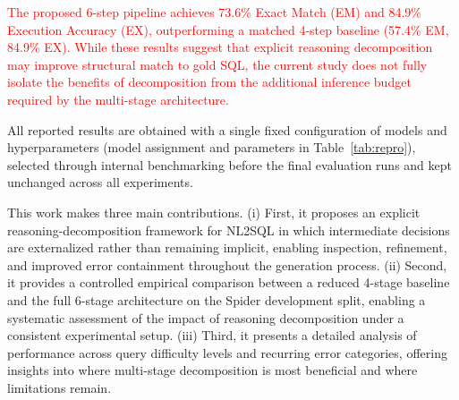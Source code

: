 \documentclass{svproc}
\begin{document}
\textcolor{red}{The proposed 6-step pipeline achieves 73.6\% Exact Match (EM) and 84.9\% Execution Accuracy (EX), outperforming a matched 4-step baseline (57.4\% EM, 84.9\% EX). While these results suggest that explicit reasoning decomposition may improve structural match to gold SQL, the current study does not fully isolate the benefits of decomposition from the additional inference budget required by the multi-stage architecture.}

All reported results are obtained with a single fixed configuration of models and hyperparameters (model assignment and parameters in Table~\ref{tab:repro}), selected through internal benchmarking before the final evaluation runs and kept unchanged across all experiments.


This work makes three main contributions. (i) First, it proposes an explicit reasoning-decomposition framework for NL2SQL in which intermediate decisions are externalized rather than remaining implicit, enabling inspection, refinement, and improved error containment throughout the generation process. (ii) Second, it provides a controlled empirical comparison between a reduced 4-stage baseline and the full 6-stage architecture on the Spider development split, enabling a systematic assessment of the impact of reasoning decomposition under a consistent experimental setup. (iii) Third, it presents a detailed analysis of performance across query difficulty levels and recurring error categories, offering insights into where multi-stage decomposition is most beneficial and where limitations remain.



\end{document}

